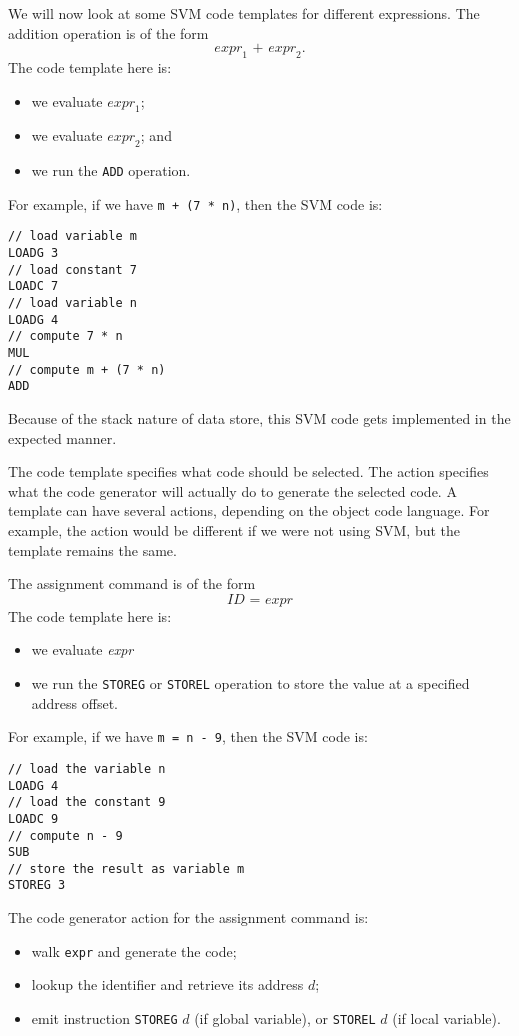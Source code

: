 \documentclass[a4paper, openany]{memoir}
\begin{document}
We will now look at some SVM code templates for different expressions. The addition operation is of the form
\[\textit{expr}_1 \texttt{ + } \textit{expr}_2.\]
The code template here is: 
\begin{itemize}
    \item we evaluate $\textit{expr}_1$; 
    \item we evaluate $\textit{expr}_2$; and 
    \item we run the \texttt{ADD} operation.
\end{itemize}
For example, if we have \texttt{m + (7 * n)}, then the SVM code is:
\begin{lstlisting}[language=SVM]
// load variable m
LOADG 3
// load constant 7
LOADC 7
// load variable n
LOADG 4
// compute 7 * n
MUL
// compute m + (7 * n)
ADD
\end{lstlisting}
Because of the stack nature of data store, this SVM code gets implemented in the expected manner.

The code template specifies what code should be selected. The action specifies what the code generator will actually do to generate the selected code. A template can have several actions, depending on the object code language. For example, the action would be different if we were not using SVM, but the template remains the same.

The assignment command is of the form
\[\textit{ID} \texttt{ = } \textit{expr}\]
The code template here is:
\begin{itemize}
    \item we evaluate \textit{expr}
    \item we run the \texttt{STOREG} or \texttt{STOREL} operation to store the value at a specified address offset.
\end{itemize}
For example, if we have \texttt{m = n - 9}, then the SVM code is:
\begin{lstlisting}[language=SVM]
// load the variable n
LOADG 4
// load the constant 9
LOADC 9
// compute n - 9
SUB
// store the result as variable m
STOREG 3
\end{lstlisting}
The code generator action for the assignment command is:
\begin{itemize}
    \item walk \texttt{expr} and generate the code;
    \item lookup the identifier and retrieve its address $d$;
    \item emit instruction \texttt{STOREG} $d$ (if global variable), or \texttt{STOREL} $d$ (if local variable).
\end{itemize}
\end{document}
